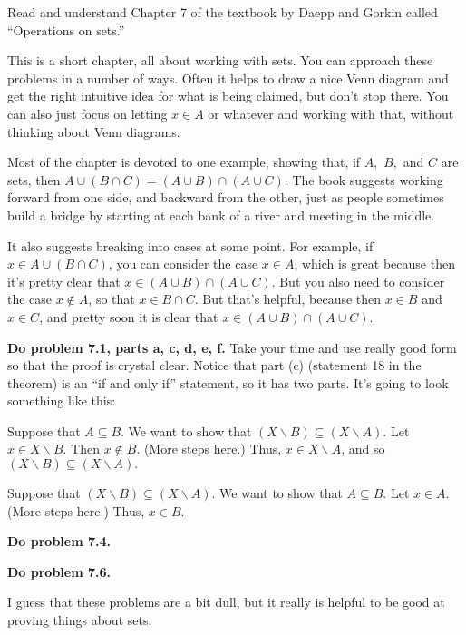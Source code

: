 
Read and understand Chapter 7 of the textbook by Daepp and Gorkin called ``Operations on sets.''

This is a short chapter, all about working with sets.
You can approach these problems in a number of ways.
Often it helps to draw a nice Venn diagram and get the right intuitive idea for what is being claimed, but don't stop there.
You can also just focus on letting $x \in A$ or whatever and working with that, without thinking about Venn diagrams.

Most of the chapter is devoted to one example, showing that, if $A,$ $B,$ and $C$ are sets, then $A \cup (B \cap C) = (A \cup B) \cap (A \cup C)$.
The book suggests working forward from one side, and backward from the other, just as people sometimes build a bridge by starting at each bank of a river and meeting in the middle.

It also suggests breaking into cases at some point.  For example, if $x \in A \cup (B \cap C)$, you can consider the case $x \in A$, which is great because then it's pretty clear that $x \in (A \cup B) \cap (A \cup C)$.  But you also need to consider the case $x \notin A$, so that $x \in B \cap C$.  But that's helpful, because then $x \in B$ and $x \in C$, and pretty soon it is clear that 
$x \in (A \cup B) \cap (A \cup C)$.

{\bf Do problem 7.1, parts a, c, d, e, f.}  Take your time and use really good form so that the proof is crystal clear.  Notice that part (c) (statement 18 in the theorem) is an ``if and only if'' statement, so it has two parts.  It's going to look something like this:
\blist{0in}
\item Suppose that $A \subseteq B$.  We want to show that $(X \backslash B) \subseteq (X \backslash A).$  Let $x \in X \backslash B$.  Then $x \notin B$.  (More steps here.) Thus, $x \in X \backslash A$, and so $(X \backslash B) \subseteq (X \backslash A).$
\item Suppose that $(X \backslash B) \subseteq (X \backslash A).$  We want to show that $A \subseteq B$.  Let $x \in A$. (More steps here.)  Thus, $x \in B$.
\elist

{\bf Do problem 7.4.}

{\bf Do problem 7.6.}

I guess that these problems are a bit dull, but it really is helpful to be good at proving things about sets.


